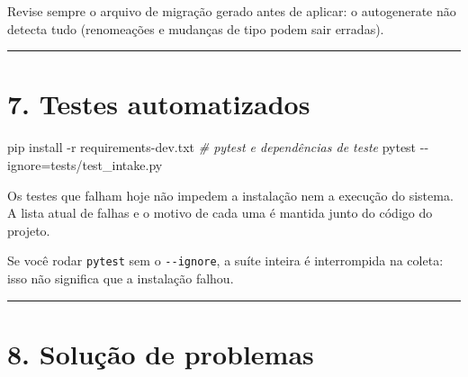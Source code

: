\documentclass[
  brazilian,
  a4paper,12pt,oneside]{report}
\newenvironment{Shaded}{}{}
\newcommand{\CommentTok}[1]{\textcolor[rgb]{0.38,0.63,0.69}{\textit{#1}}}
\newcommand{\FunctionTok}[1]{\textcolor[rgb]{0.02,0.16,0.49}{#1}}
\newcommand{\NormalTok}[1]{#1}
\newcommand{\OperatorTok}[1]{\textcolor[rgb]{0.40,0.40,0.40}{#1}}
\begin{document}
Revise sempre o arquivo de migração gerado antes de aplicar: o
autogenerate não detecta tudo (renomeações e mudanças de tipo podem sair
erradas).

\begin{center}\rule{0.5\linewidth}{0.5pt}\end{center}

\chapter{7. Testes automatizados}\label{testes-automatizados}

\begin{Shaded}
\begin{Highlighting}[]
\NormalTok{pip install }\OperatorTok{{-}}\NormalTok{r requirements{-}dev}\OperatorTok{.}\FunctionTok{txt}   \CommentTok{\# pytest e dependências de teste}
\NormalTok{pytest }\OperatorTok{{-}{-}}\NormalTok{ignore}\OperatorTok{=}\NormalTok{tests}\OperatorTok{/}\NormalTok{test\_intake}\OperatorTok{.}\FunctionTok{py}
\end{Highlighting}
\end{Shaded}

Os testes que falham hoje não impedem a instalação nem a execução do
sistema. A lista atual de falhas e o motivo de cada uma é mantida junto
do código do projeto.

Se você rodar \texttt{pytest} sem o
\texttt{-}\allowbreak{}\texttt{-}\allowbreak{}\texttt{ignore}, a suíte
inteira é interrompida na coleta: isso não significa que a instalação
falhou.

\begin{center}\rule{0.5\linewidth}{0.5pt}\end{center}

\chapter{8. Solução de problemas}\label{soluuxe7uxe3o-de-problemas}
\end{document}
